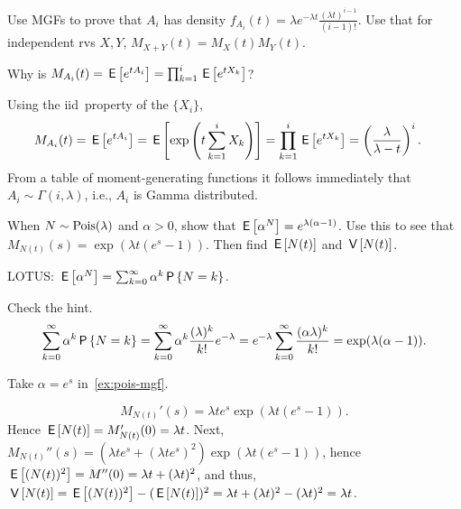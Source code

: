 \documentclass[queueing-book.tex]{subfiles}
\begin{document}
\begin{exercise}\label{ex:54}
Use MGFs to  prove that $A_i$ has density
$f_{A_i}(t) = \lambda e^{-\lambda t} \frac{(\lambda t)^{i-1}}{(i-1)!}$.
Use that for independent rvs $X, Y$, $M_{X+Y}(t)=M_{X}(t) M_{Y}(t)$.
\begin{hint}
Why is $M_{A_i}(t) = \E{e^{t A_i}} = \prod_{k=1}^{i} \E{e^{tX_k}}$?
\end{hint}
\begin{solution}
 Using the iid\ property of the $\{X_i\}$,
\begin{align*}
 M_{A_i}(t) &= \E{e^{t A_i}} = \E{\exp\left(t\sum_{k=1}^{i} X_k\right)}  = \prod_{k=1}^{i} \E{e^{tX_k}} =
  \left(\frac{\lambda}{\lambda -t }\right)^i.
\end{align*}
From a table of moment-generating functions it follows immediately that
$A_i \sim \Gamma(i,\lambda)$, i.e., $A_i$ is Gamma distributed.
\end{solution}
\end{exercise}

\begin{exercise}\label{ex:pois-mgf}
When $N \sim \Pois{\lambda}$ and $\alpha > 0$, show that $\E{\alpha^{N}} = e^{\lambda(\alpha-1)}$.
Use this to see that $M_{N(t)}(s) = \exp{(\lambda t(e^s-1))}$. Then  find $\E{N(t)}$ and $\V{N(t)}$.
\begin{hint}
LOTUS: $\E{\alpha^{N}} = \sum_{k=0}^\infty \alpha^{k} \P{N=k}$.
\end{hint}
\begin{solution}
Check the hint.
\begin{align*}
\sum_{k=0}^\infty \alpha^{k} \P{N=k} = \sum_{k=0}^\infty \alpha^{k} \frac{(\lambda)^k}{k!} e^{-\lambda}
= e^{-\lambda} \sum_{k=0}^\infty \frac{(\alpha \lambda)^k}{k!} =\exp(\lambda (\alpha - 1)).
\end{align*}

Take $\alpha=e^{s}$ in~\cref{ex:pois-mgf}.

 \begin{equation*}
 M_{N(t)}'(s) = \lambda t e^s \exp(\lambda t(e^s - 1)).
 \end{equation*}
 Hence $\E{N(t)} = M_{N(t)}'(0) = \lambda t $.
Next, $M_{N(t)}''(s) = (\lambda t e^s + (\lambda t e^s)^2) \exp(\lambda t(e^s - 1))$, hence $\E{(N(t))^2} = M''(0) = \lambda t + (\lambda t)^2$, and thus, $\V{N(t)} =\E{(N(t))^2}-(\E{N(t)})^2 = \lambda t + (\lambda t)^2 - (\lambda t)^2 = \lambda t$.

\end{solution}
\end{exercise}
\end{document}
